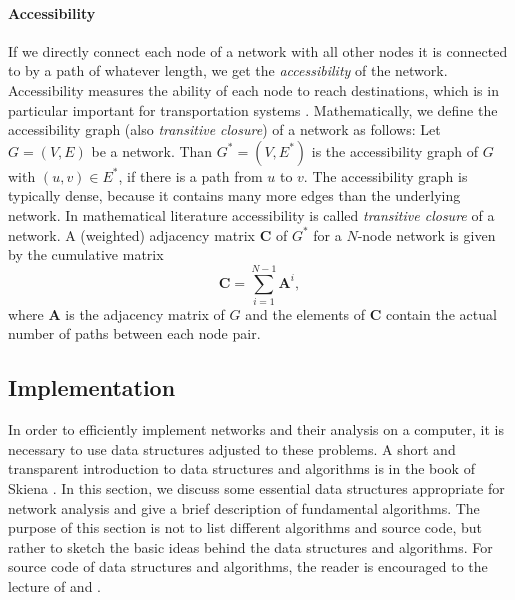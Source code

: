 \documentclass[openright,twoside,headsepline]{scrbook}
\begin{document}
\paragraph{Accessibility\color{Cayenne}{.}}
If we directly connect each node of a network with all other nodes it is connected to by a path of whatever length, we get the \emph{accessibility} of the network.
Accessibility measures the ability of each node to reach destinations, which is in particular important for transportation systems \citep{Garrison:1960up}.
Mathematically, we define the accessibility graph (also \emph{transitive closure}) of a network as follows:
Let $G=(V,E)$ be a network.
Than $G^*=(V,E^*)$ is the accessibility graph of $G$ with $(u,v) \in E^*$, if there is a path from $u$ to $v$.
The accessibility graph is typically dense, because it contains many more edges than the underlying network.
In mathematical literature accessibility is called \emph{transitive closure} of a network.
A (weighted) adjacency matrix $\mathbf{C}$ of $G^*$ for a $N$-node network is given by the cumulative matrix
\begin{equation}\label{eq:cumulative_matrix}
\mathbf{C}= \sum _{i=1} ^{N-1} \mathbf{A}^i,
\end{equation}
where $\mathbf{A}$ is the adjacency matrix of $G$ and the elements of $\mathbf{C}$ contain the actual number of paths between each node pair.

\subsection{Implementation}\label{sec:implementation}
In order to efficiently implement networks and their analysis on a computer, it is necessary to use data structures adjusted to these problems.
A short and transparent introduction to data structures and algorithms is in the book of Skiena \citep{algorithm_design}.
In this section, we discuss some essential data structures appropriate for network analysis and give a brief description of fundamental algorithms.
The purpose of this section is not to list different algorithms and source code, but rather to sketch the basic ideas behind the data structures and algorithms.
For source code of data structures and algorithms, the reader is encouraged to the lecture of \citep{algorithm_design} and \citep{Merali:2010ih}.
\end{document}
